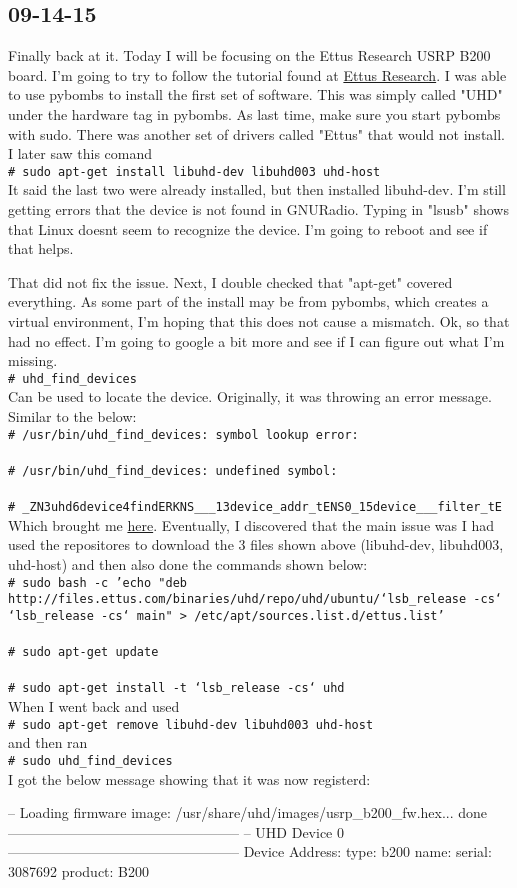 \documentclass{article}
\newcommand{\shellcmd}[1]{\\\indent\indent\texttt{\footnotesize\# #1}\\}
\begin{document}
	\subsection{09-14-15}
	Finally back at it. Today I will be focusing on the Ettus Research USRP B200 board. I'm going to try to follow
	the tutorial found at \href{http://www.ettus.com/kb/detail/software-defined-radio-usrp-and-gnu-radio-tutorial-set}{Ettus Research}.
	I was able to use pybombs to install the first set of software. This was simply called "UHD" under the hardware tag in pybombs. 
	As last time, make sure you start pybombs with sudo. There was another set of drivers called "Ettus" that would not install. 
	I later saw this comand \shellcmd{sudo apt-get install libuhd-dev libuhd003 uhd-host}
	It said the last two were already installed, but then installed libuhd-dev. I'm still getting errors that the device is not
	found in GNURadio. Typing in "lsusb" shows that Linux doesnt seem to recognize the device. I'm going to reboot and see if that helps. 		

	That did not fix the issue. Next, I double checked that "apt-get" covered everything. As some part of the install may be from pybombs,
	which creates a virtual environment, I'm hoping that this does not cause a mismatch. Ok, so that had no effect. I'm going to google
	a bit more and see if I can figure out what I'm missing. \shellcmd{uhd\_find\_devices} Can be used to locate the device. Originally, it was 
	throwing an error message. Similar to the below: 
	\shellcmd{/usr/bin/uhd\_find\_devices: symbol lookup error:}
	\shellcmd{/usr/bin/uhd\_find\_devices: undefined symbol:}
	\shellcmd{\_ZN3uhd6device4findERKNS\_\_\_13device\_addr\_tENS0\_15device\_\_\_filter\_tE}
	Which brought me \href{http://lists.ettus.com/pipermail/usrp-users\_lists.ettus.com/2014-November/011546.html}{here}. Eventually,
	I discovered that the main issue was I had used the repositores to download the 3 files shown above (libuhd-dev, libuhd003, uhd-host) and then
	also done the commands shown below:
	\shellcmd{sudo bash -c 'echo "deb http://files.ettus.com/binaries/uhd/repo/uhd/ubuntu/`lsb\_release -cs` `lsb\_release -cs` main" > /etc/apt/sources.list.d/ettus.list'}
	\shellcmd{sudo apt-get update}
	\shellcmd{sudo apt-get install -t `lsb\_release -cs` uhd}
	When I went back and used \shellcmd{sudo apt-get remove libuhd-dev libuhd003 uhd-host} and then ran \shellcmd{sudo uhd\_find\_devices} I got the below message
	showing that it was now registerd:

	-- Loading firmware image: /usr/share/uhd/images/usrp\_b200\_fw.hex... done
	--------------------------------------------------
	-- UHD Device 0
	--------------------------------------------------
	Device Address:
	    type: b200
	    name: 
	    serial: 3087692
	    product: B200
		
\end{document}
